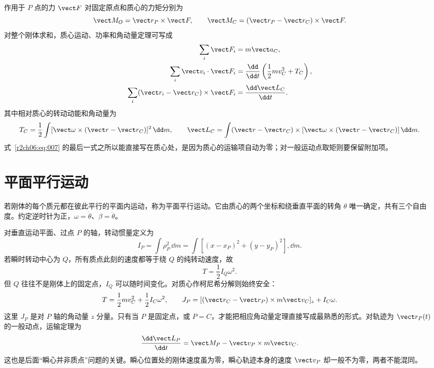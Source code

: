 作用于 $P$ 点的力 $\vect F$ 对固定原点和质心的力矩分别为
\begin{equation}
 \vect M_O=\vect r_P\times\vect F,
 \qquad \vect M_C=(\vect r_P-\vect r_C)\times\vect F.
 \label{r2ch06:eq:006}
\end{equation}
对整个刚体求和，质心运动、功率和角动量定理可写成
\begin{equation}
 \begin{aligned}
  \sum_i\vect F_i&=m\vect a_C,\\
  \sum_i\vect v_i\cdot\vect F_i
   &=\frac{\dd}{\dd t}\left(\frac12mv_C^2+T_C\right),\\
  \sum_i(\vect r_i-\vect r_C)\times\vect F_i
   &=\frac{\dd\vect L_C}{\dd t}.
 \end{aligned}
 \label{r2ch06:eq:007}
\end{equation}
其中相对质心的转动动能和角动量为
\begin{equation}
 T_C=\frac12\int[\vect\omega\times(\vect r-\vect r_C)]^2\,\dd m,
 \qquad
 \vect L_C=\int(\vect r-\vect r_C)\times
 [\vect\omega\times(\vect r-\vect r_C)]\,\dd m.
 \label{r2ch06:eq:008}
\end{equation}
式~\eqref{r2ch06:eq:007} 的最后一式之所以能直接写在质心处，是因为质心的运输项自动为零；对一般运动点取矩则要保留附加项。

\section{平面平行运动}
\label{r2ch06:sec:planar}

若刚体的每个质元都在彼此平行的平面内运动，称为平面平行运动。它由质心的两个坐标和绕垂直平面的转角 $\theta$ 唯一确定，共有三个自由度。约定逆时针为正，$\omega=\dot\theta$、$\beta=\ddot\theta$。

对垂直运动平面、过点 $P$ 的轴，转动惯量定义为
\begin{equation}
 I_P=\int \rho_P^2\,\dd m
 =\int[(x-x_P)^2+(y-y_P)^2],\dd m.
 \label{r2ch06:eq:009}
\end{equation}
若瞬时转动中心为 $Q$，所有质点此刻的速度都等于绕 $Q$ 的纯转动速度，故
\begin{equation}
 T=\frac12I_Q\omega^2.
 \label{r2ch06:eq:010}
\end{equation}
但 $Q$ 往往不是刚体上的固定点，$I_Q$ 可以随时间变化。对质心作柯尼希分解则始终安全：
\begin{equation}
 T=\frac12mv_C^2+\frac12I_C\omega^2,\qquad
 J_P=[(\vect r_C-\vect r_P)\times m\vect v_C]_z+I_C\omega.
 \label{r2ch06:eq:011}
\end{equation}
这里 $J_P$ 是对 $P$ 轴的角动量 $z$ 分量。只有当 $P$ 是固定点，或 $P=C$，才能把相应角动量定理直接写成最熟悉的形式。对轨迹为 $\vect r_P(t)$ 的一般动点，运输定理为
\begin{equation}
 \frac{\dd\vect L_P}{\dd t}=\vect M_P-\vect v_P\times m\vect v_C.
 \label{r2ch06:eq:012}
\end{equation}
这也是后面“瞬心并非质点”问题的关键。瞬心位置处的刚体速度虽为零，瞬心轨迹本身的速度 $\vect v_P$ 却一般不为零，两者不能混同。

